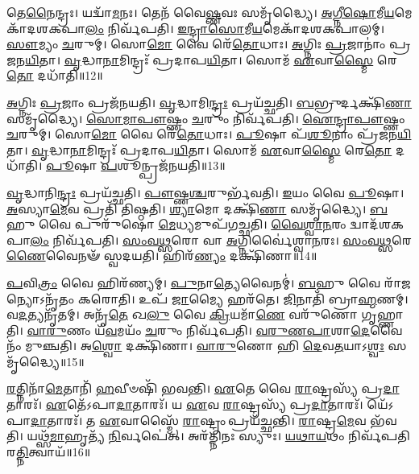 𑌤𑍇\-\ul{𑌨𑍈}\-𑌨𑍍𑌦𑍍𑌰𑌃।
𑌯𑌦𑍍𑌵𑌾᳴\-\ul{𑌮}\-𑌨𑌃।
𑌤𑍇𑌨᳴ 𑌵𑍈\-\ul{𑌷𑍍𑌣}\-𑌵𑌃 𑌸𑌮𑍃᳴𑌦𑍍𑌧𑍍𑌯𑍈।
\-\ul{𑌅}\-\-\ul{𑌗𑍍𑌨𑍀}\-\-\ul{𑌷𑍋}\-𑌮𑍀\-\ul{𑌯}\-𑌮𑍇𑌕𑌾᳴\-\-𑌦𑌶\-𑌕𑌪𑌾\-\ul{𑌲𑌂} 𑌨𑌿𑌰𑍍𑌵᳴𑌪𑌤𑌿।
\-\ul{𑌇}\-\-\ul{𑌨𑍍𑌦𑍍𑌰𑌾}\-\-\ul{𑌸𑍋}\-𑌮𑍀\-\ul{𑌯}\-𑌮𑍇𑌕𑌾᳴\-𑌦𑌶\-𑌕𑌪𑌾𑌲𑌮𑍍।
\-\ul{𑌸𑍗}\-𑌮𑍍𑌯𑌂 \ul{𑌚}\-𑌰𑍁𑌮𑍍।
𑌸𑍋\-\ul{𑌮𑍋} 𑌵𑍈 𑌰𑍇᳴\-\ul{𑌤𑍋}\-𑌧𑌾𑌃।
\-\ul{𑌅}\-𑌗𑍍𑌨𑌿𑌃 \ul{𑌪𑍍𑌰}\-𑌜𑌾𑌨𑌾𑌂॑ 𑌪𑍍𑌰𑌜𑌨\-\ul{𑌯𑌿}\-𑌤𑌾।
\-\ul{𑌵𑍃}\-𑌦𑍍𑌧𑌾\-\ul{𑌨𑌾}\-𑌮𑌿𑌨𑍍𑌦𑍍𑌰𑌃᳴ 𑌪𑍍𑌰𑌦𑌾𑌪\-\ul{𑌯𑌿}\-𑌤𑌾।
𑌸𑍋𑌮᳴ \ul{𑌏}\-𑌵𑌾\-\ul{𑌸𑍍𑌮𑍈} 𑌰𑍇\-\ul{𑌤𑍋} 𑌦𑌧𑌾᳴𑌤𑌿॥12॥

\-\ul{𑌅}\-𑌗𑍍𑌨𑌿𑌃 \ul{𑌪𑍍𑌰}\-𑌜𑌾𑌂 𑌪𑍍𑌰𑌜᳴𑌨𑌯𑌤𑌿।
\-\ul{𑌵𑍃}\-𑌦𑍍𑌧𑌾𑌮𑌿\-\ul{𑌨𑍍𑌦𑍍𑌰𑌃} 𑌪𑍍𑌰𑌯᳴𑌚𑍍𑌛𑌤𑌿।
\-\ul{𑌬}\-𑌭𑍍𑌰𑍁𑌰𑍍𑌦𑌕𑍍𑌷𑌿᳴\-\ul{𑌣𑌾} 𑌸𑌮𑍃᳴𑌦𑍍𑌧𑍍𑌯𑍈।
\-\ul{𑌸𑍋}\-\-\ul{𑌮𑌾}\-\-\ul{𑌪𑍗}\-𑌷𑍍𑌣𑌂 \ul{𑌚}\-𑌰𑍁𑌂 𑌨𑌿𑌰𑍍𑌵᳴𑌪𑌤𑌿।
\-\ul{𑌐}\-\-\ul{𑌨𑍍𑌦𑍍𑌰𑌾}\-\-\ul{𑌪𑍗}\-𑌷𑍍𑌣𑌂 \ul{𑌚}\-𑌰𑍁𑌮𑍍।
𑌸𑍋\-\ul{𑌮𑍋} 𑌵𑍈 𑌰𑍇᳴\-\ul{𑌤𑍋}\-𑌧𑌾𑌃।
\-\ul{𑌪𑍂}\-𑌷𑌾 𑌪᳴\-\ul{𑌶𑍂}\-𑌨𑌾𑌂 𑌪𑍍𑌰᳴𑌜𑌨\-\ul{𑌯𑌿}\-𑌤𑌾।
\-\ul{𑌵𑍃}\-𑌦𑍍𑌧𑌾\-\ul{𑌨𑌾}\-𑌮𑌿𑌨𑍍𑌦𑍍𑌰𑌃᳴ 𑌪𑍍𑌰𑌦𑌾𑌪\-\ul{𑌯𑌿}\-𑌤𑌾।
𑌸𑍋𑌮᳴ \ul{𑌏}\-𑌵𑌾\-\ul{𑌸𑍍𑌮𑍈} 𑌰𑍇\-\ul{𑌤𑍋} 𑌦𑌧𑌾᳴𑌤𑌿।
\-\ul{𑌪𑍂}\-𑌷𑌾 \ul{𑌪}\-𑌶𑍂𑌨𑍍𑌪𑍍𑌰𑌜᳴𑌨𑌯𑌤𑌿॥13॥

\-\ul{𑌵𑍃}\-𑌦𑍍𑌧𑌾𑌨𑌿\-\ul{𑌨𑍍𑌦𑍍𑌰𑌃} 𑌪𑍍𑌰𑌯᳴𑌚𑍍𑌛𑌤𑌿।
\-\ul{𑌪𑍗}\-𑌷𑍍𑌣\-\ul{𑌶𑍍𑌚}\-𑌰𑍁𑌰𑍍𑌭᳴𑌵𑌤𑌿।
\-\ul{𑌇}\-𑌯𑌂 𑌵𑍈 \ul{𑌪𑍂}\-𑌷𑌾।
\-\ul{𑌅}\-𑌸𑍍𑌯𑌾\-\ul{𑌮𑍇}\-𑌵 𑌪𑍍𑌰𑌤𑌿᳴ 𑌤𑌿𑌷𑍍𑌠𑌤𑌿।
\-\ul{𑌶𑍍𑌯𑌾}\-𑌮𑍋 𑌦𑌕𑍍𑌷𑌿᳴\-\ul{𑌣𑌾} 𑌸𑌮𑍃᳴𑌦𑍍𑌧𑍍𑌯𑍈।
\-\ul{𑌬}\-𑌹𑍁 𑌵𑍈 𑌪𑍁𑌰𑍁᳴𑌷𑍋 \ul{𑌮𑍇}\-𑌧𑍍𑌯𑌮𑍁𑌪᳴𑌗𑌚𑍍𑌛𑌤𑌿।
\-\ul{𑌵𑍈}\-\-\ul{𑌶𑍍𑌵𑌾}\-\-\ul{𑌨}\-𑌰𑌂 𑌦𑍍𑌵𑌾𑌦᳴𑌶𑌕𑌪𑌾\-\ul{𑌲𑌂} 𑌨𑌿𑌰𑍍𑌵᳴𑌪𑌤𑌿।
\-\ul{𑌸𑌂}\-\-\ul{𑌵}\-\-\ul{𑌥𑍍𑌸}\-𑌰𑍋 𑌵𑌾 \ul{𑌅}\-𑌗𑍍𑌨𑌿𑌰𑍍𑌵𑍈॑𑌶𑍍𑌵𑌾\-\ul{𑌨}\-𑌰𑌃।
\-\ul{𑌸𑌂}\-\-\ul{𑌵}\-\-\ul{𑌥𑍍𑌸}\-𑌰𑍇\-\ul{𑌣𑍈}\-𑌵𑍈𑌨𑍟᳴ 𑌸𑍍𑌵𑌦𑌯𑌤𑌿।
𑌹𑌿𑌰᳴\-\ul{𑌣𑍍𑌯𑌂} 𑌦𑌕𑍍𑌷𑌿᳴𑌣𑌾॥14॥

\-\ul{𑌪}\-𑌵𑌿\-\ul{𑌤𑍍𑌰𑌂} 𑌵𑍈 𑌹𑌿𑌰᳴𑌣𑍍𑌯𑌮𑍍।
\-\ul{𑌪𑍁}\-𑌨𑌾\-\ul{𑌤𑍍𑌯𑍇}\-𑌵𑍈𑌨𑌮𑍍॑।
\-\ul{𑌬}\-𑌹𑍁 𑌵𑍈 𑌰𑌾᳴\-\ul{𑌜}\-𑌨𑍍𑌯𑍋\-𑌽𑌨𑍃᳴𑌤𑌂 𑌕𑌰𑍋𑌤𑌿।
𑌉𑌪᳴ \ul{𑌜𑌾}\-𑌮𑍍𑌯𑍈 𑌹𑌰᳴𑌤𑍇।
\-\ul{𑌜𑌿}\-𑌨𑌾𑌤𑌿᳴ 𑌬𑍍𑌰𑌾\-\ul{𑌹𑍍𑌮}\-𑌣𑌮𑍍।
𑌵\-\ul{𑌦}\-𑌤𑍍𑌯𑌨𑍃᳴𑌤𑌮𑍍।
𑌅𑌨𑍃᳴\-\ul{𑌤𑍇} 𑌖\-\ul{𑌲𑍁} 𑌵𑍈 \ul{𑌕𑍍𑌰𑌿}\-𑌯𑌮𑌾᳴\-\ul{𑌣𑍇} 𑌵𑌰𑍁᳴𑌣𑍋 𑌗𑍃𑌹𑍍𑌣𑌾𑌤𑌿।
\-\ul{𑌵𑌾}\-\-\ul{𑌰𑍁}\-𑌣𑌂 𑌯᳴\-\ul{𑌵}\-𑌮𑌯𑌂᳴ \ul{𑌚}\-𑌰𑍁𑌂 𑌨𑌿𑌰𑍍𑌵᳴𑌪𑌤𑌿।
\-\ul{𑌵}\-\-\ul{𑌰𑍁}\-\-\ul{𑌣}\-\-\ul{𑌪𑌾}\-𑌶𑌾\-\ul{𑌦𑍇}\-𑌵𑍈𑌨𑌂᳴ 𑌮𑍁𑌞𑍍𑌚𑌤𑌿।
𑌅\-\ul{𑌶𑍍𑌵𑍋} 𑌦𑌕𑍍𑌷𑌿᳴𑌣𑌾।
\-\ul{𑌵𑌾}\-\-\ul{𑌰𑍁}\-𑌣𑍋 𑌹𑌿 \ul{𑌦𑍇}\-𑌵\-\ul{𑌤}\-𑌯𑌾\-𑌽\-\ul{𑌶𑍍𑌵𑌃} 𑌸𑌮𑍃᳴𑌦𑍍𑌧𑍍𑌯𑍈॥15॥\anuvakamend[\-\ul{𑌐}\-\-\ul{𑌨𑍍𑌦𑍍𑌰𑌾}\-\-\ul{𑌵𑍈}\-\-\ul{𑌷𑍍𑌣}\-𑌵𑌮𑍇𑌕𑌾᳴\-𑌦𑌶\-𑌕𑌪𑌾\-\ul{𑌲𑌂} 𑌯𑌦𑍃᳴\-\ul{𑌷}\-𑌭𑍋 𑌦𑌧𑌾᳴𑌤𑌿 \ul{𑌪𑍂}\-𑌷𑌾 \ul{𑌪}\-𑌶𑍂𑌨𑍍𑌪𑍍𑌰𑌜᳴𑌨𑌯\-\ul{𑌤𑌿} 𑌹𑌿𑌰᳴\-\ul{𑌣𑍍𑌯𑌂} 𑌦𑌕𑍍𑌷𑌿᳴\-\ul{𑌣𑌾} 𑌦\-\ul{𑌕𑍍𑌷𑌿}\-𑌣𑍈𑌕𑌂᳴ 𑌚]

\-\ul{𑌰}\-𑌤𑍍𑌨𑌿𑌨𑌾᳴\-\ul{𑌮𑍇}\-𑌤𑌾𑌨𑌿᳴ \ul{𑌹}\-𑌵𑍀𑍞𑌷𑌿᳴ 𑌭𑌵𑌨𑍍𑌤𑌿।
\-\ul{𑌏}\-𑌤𑍇 𑌵𑍈 \ul{𑌰𑌾}\-𑌷𑍍𑌟𑍍𑌰𑌸𑍍𑌯᳴ 𑌪𑍍𑌰\-\ul{𑌦𑌾}\-𑌤𑌾𑌰𑌃᳴।
\-\ul{𑌏}\-𑌤𑍇᳴\-𑌽𑌪𑌾\-\ul{𑌦𑌾}\-𑌤𑌾𑌰𑌃᳴।
𑌯 \ul{𑌏}\-𑌵 \ul{𑌰𑌾}\-𑌷𑍍𑌟𑍍𑌰𑌸𑍍𑌯᳴ 𑌪𑍍𑌰\-\ul{𑌦𑌾}\-𑌤𑌾𑌰𑌃᳴।
𑌯𑍇᳴𑌽𑌪𑌾\-\ul{𑌦𑌾}\-𑌤𑌾𑌰𑌃᳴।
𑌤 \ul{𑌏}\-𑌵𑌾𑌸𑍍𑌮𑍈᳴ \ul{𑌰𑌾}\-𑌷𑍍𑌟𑍍𑌰𑌂 𑌪𑍍𑌰𑌯᳴𑌚𑍍𑌛𑌨𑍍𑌤𑌿।
\-\ul{𑌰𑌾}\-𑌷𑍍𑌟𑍍𑌰\-\ul{𑌮𑍇}\-𑌵 𑌭᳴𑌵𑌤𑌿।
𑌯𑌥𑍍𑌸᳴\-\ul{𑌮𑌾}\-𑌹𑍃𑌤𑍍𑌯᳴ \ul{𑌨𑌿}\-𑌰𑍍𑌵𑌪𑍇॑𑌤𑍍।
𑌅𑌰᳴𑌤𑍍𑌨𑌿𑌨𑌃 𑌸𑍍𑌯𑍁𑌃।
\-\ul{𑌯}\-\-\ul{𑌥𑌾}\-\-\ul{𑌯}\-𑌥𑌂 𑌨𑌿𑌰𑍍𑌵᳴𑌪𑌤𑌿 𑌰\-\ul{𑌤𑍍𑌨𑌿}\-𑌤𑍍𑌵𑌾𑌯᳴॥16॥

